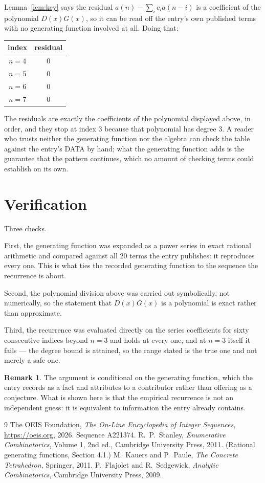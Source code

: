 \documentclass[11pt,a4paper]{article}
\theoremstyle{plain}
\theoremstyle{definition}
\newtheorem{remark}[theorem]{Remark}
\begin{document}
Lemma~\ref{lem:key} says the residual $a(n)-\sum_ic_ia(n-i)$ is a coefficient of the
polynomial $D(x)G(x)$, so it can be read off the entry's own published terms with no
generating function involved at all. Doing that:
\begin{center}
\begin{tabular}{cc}
index & residual \\ \hline
$n=4$ & $0$ \\
$n=5$ & $0$ \\
$n=6$ & $0$ \\
$n=7$ & $0$
\end{tabular}
\end{center}
The residuals are exactly the coefficients of the polynomial displayed above, in order, and
they stop at index $3$ because that polynomial has degree $3$. A reader who trusts
neither the generating function nor the algebra can check the table against the entry's DATA
by hand; what the generating function adds is the guarantee that the pattern continues, which
no amount of checking terms could establish on its own.

\section{Verification}

Three checks.

First, the generating function was expanded as a power series in exact rational arithmetic and
compared against all $20$ terms the entry publishes: it reproduces every one. This is
what ties the recorded generating function to the sequence the recurrence is about.

Second, the polynomial division above was carried out symbolically, not numerically, so the
statement that $D(x)G(x)$ is a polynomial is exact rather than approximate.

Third, the recurrence was evaluated directly on the series coefficients for sixty consecutive
indices beyond $n=3$ and holds at every one, and at $n=3$ itself it fails --- the
degree bound is attained, so the range stated is the true one and not merely a safe one.

\begin{remark}
The argument is conditional on the generating function, which the entry records as a fact and
attributes to a contributor rather than offering as a conjecture. What is shown here is that
the empirical recurrence is not an independent guess: it is equivalent to information the
entry already contains.
\end{remark}

\begin{thebibliography}{9}
 The OEIS Foundation, \emph{The On-Line Encyclopedia of Integer
Sequences}, \url{https://oeis.org}, 2026. Sequence A221374.
 R.~P.~Stanley, \emph{Enumerative Combinatorics}, Volume 1, 2nd ed.,
Cambridge University Press, 2011. (Rational generating functions, Section 4.1.)
 M.~Kauers and P.~Paule, \emph{The Concrete Tetrahedron}, Springer, 2011.
 P.~Flajolet and R.~Sedgewick, \emph{Analytic Combinatorics}, Cambridge
University Press, 2009.
\end{thebibliography}
\end{document}
